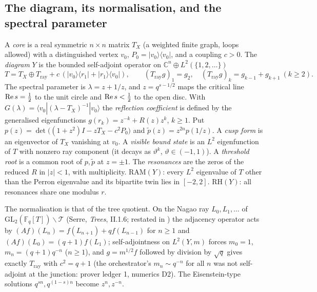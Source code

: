 \subsection{The diagram, its normalisation, and the spectral parameter}

\begin{definition}
\label{def:cusp-diagram}
A \emph{core} is a real symmetric $n\times n$ matrix $T_X$ (a weighted finite graph, loops allowed) with a
distinguished vertex $v_0$, $P_0 = |v_0\rangle\langle v_0|$, and a coupling $c>0$. The \emph{diagram} $Y$ is
the bounded self-adjoint operator on $\mathbb C^n\oplus L^2(\{1,2,\dots\})$
\[
T = T_X\oplus T_{\mathrm{ray}} + c\,(|v_0\rangle\langle r_1| + |r_1\rangle\langle v_0|),\qquad
(T_{\mathrm{ray}}g)_1 = g_2,\quad (T_{\mathrm{ray}}g)_k = g_{k-1}+g_{k+1}\ (k\ge2).
\]
The spectral parameter is $\lambda = z+1/z$, and $z = q^{s-1/2}$ maps the critical line $\operatorname{Re} s = \tfrac12$
to the unit circle and $\operatorname{Re} s<\tfrac12$ to the open disc. With $G(\lambda) = \langle v_0|(\lambda-T_X)^{-1}|v_0\rangle$
the \emph{reflection coefficient} is defined by the generalised eigenfunctions $g(r_k) = z^{-k}+R(z)z^{k}$,
$k\ge1$. Put $p(z) = \det\big((1+z^2)I - zT_X - c^2P_0\big)$ and $\tilde p(z) = z^{2n}p(1/z)$.
A \emph{cusp form} is an eigenvector of $T_X$ vanishing at $v_0$. A \emph{visible bound state} is an
$L^2$ eigenfunction of $T$ with nonzero ray component (it decays as $\vartheta^k$, $\vartheta\in(-1,1)$).
A \emph{threshold root} is a common root of $p,\tilde p$ at $z=\pm1$. The \emph{resonances} are the zeros
of the reduced $R$ in $|z|<1$, with multiplicity. $\mathrm{RAM}(Y)$: every $L^2$ eigenvalue of $T$ other
than the Perron eigenvalue and its bipartite twin lies in $[-2,2]$. $\mathrm{RH}(Y)$: all resonances share
one modulus $r$.
\end{definition}

The normalisation is that of the tree quotient. On the Nagao ray $L_0,L_1,\dots$ of
$\mathrm{GL}_2(\mathbb F_q[T])\backslash\mathcal T$ (Serre, \emph{Trees}, II.1.6; restated in
\cite{arends2026resonances}) the adjacency operator acts by $(Af)(L_n) = f(L_{n+1})+qf(L_{n-1})$
for $n\ge1$ and $(Af)(L_0) = (q+1)f(L_1)$; self-adjointness on $L^2(Y,m)$ forces $m_0 = 1$,
$m_n = (q+1)q^{-n}$ ($n\ge1$), and $g = m^{1/2}f$ followed by division by $\sqrt q$ gives exactly
$T_{\mathrm{ray}}$ with $c^2 = q+1$ (the orchestrator's $m_n\sim q^{-n}$ for all $n$ was not self-adjoint
at the junction: prover ledger 1, numerics D2). The Eisenstein-type solutions $q^{sn}, q^{(1-s)n}$ become
$z^{n}, z^{-n}$.

